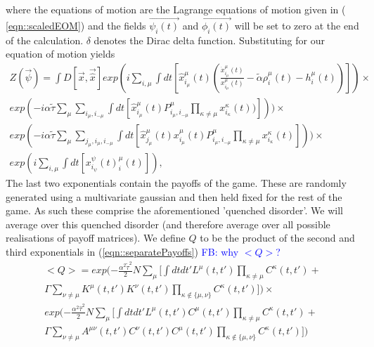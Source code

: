 \documentclass[sigconf,anonymous]{aamas}
\newcommand{\xmu}[2]{x_{#1_#2}^{#2}(t)}
\newcommand{\payoff}[2]{P^{#2}_{#1_#2, #1_{-#2}}}
\newcommand{\dxmu}[1]{\dot{x}_{#1_\mu}^{\mu} (t)}
\newcommand{\hxmu}[1]{\hat{x}_{#1_\mu}^{\mu} (t)}
\newcommand{\talpha}{\tilde{\alpha}}
\newcommand{\ttau}{\tilde{\tau}}
\newcommand{\htau}{\hat{\tau}}
\newcommand\fb[1]{\textcolor{blue}{FB: #1}}
\begin{document}
where the equations of motion are the Lagrange equations of motion
given in ( \ref{eqn::scaledEOM}) and the fields $\Vec{\psi_i(t)}$ and
$\Vec{\phi_i(t)}$ will be set to zero at the end of the
calculation. $\delta$ denotes the Dirac delta function. Substituting
for our equation of motion yields
%
{\small
\begin{equation}
\label{eqn::separatePayoffs}
	\begin{split}
	Z(\Vec{\psi}) = \int D[\Vec{x}, \Vec{\hat{x}}] exp( i \sum_{i, \mu} \int dt [ \hxmu{i} (\frac{\dxmu{i}}{\xmu{i}{\mu}} - \talpha \rho_i^\mu (t) - h_i^\mu (t))]) \times \\ exp(-i \alpha \ttau \sum_{\mu} \sum_{i_\mu, i_{-\mu}} \int dt [\hxmu{i} \payoff{i}{\mu} \prod_{\kappa \neq \mu} \xmu{i}{\kappa} )])) 
    \times \\ exp(-i \alpha \ttau \sum_{\mu} \sum_{j_\mu, i_\mu, i_{-\mu}} \int dt [\hxmu{j}  \xmu{i}{\mu} \payoff{i}{\mu} \prod_{\kappa \neq \mu} \xmu{i}{\kappa}])) 
	\times \\ exp(i \sum_{i, \mu}
	\int dt[\xmu{i} \psi^\mu_i(t)]),
\end{split}
\end{equation}
}
The last two exponentials contain the payoffs of the game. These are randomly generated using a multivariate gaussian and then held fixed for the rest of the game. As such these comprise the aforementioned 'quenched disorder'. We will average over this quenched disorder (and therefore average over all possible realisations of payoff matrices). We define $Q$ to be the product of the second and third exponentials in (\ref{eqn::separatePayoffs}) 
%
\fb{why $<Q>$?}
\begin{equation}
\begin{split}
        <Q> = exp(- \frac{\alpha^2 \ttau ^2}{2} N \sum_{\mu} \Big [ \int dt dt' L^\mu(t, t') \prod_{\kappa \neq \mu} C^\kappa (t, t') + \\ \Gamma \sum_{\nu \neq \mu} K^\mu (t, t') K^\nu (t, t') \prod_{\kappa \not\in \{\mu, \nu\}} C^\kappa (t, t') \Big ] ) \times \\
        exp(- \frac{\alpha^2 \htau ^2}{2} N \sum_{\mu} \Big [ \int dt dt' L^\mu(t, t') C^\mu (t, t') \prod_{\kappa \neq \mu} C^\kappa (t, t') + \\ \Gamma \sum_{\nu \neq \mu} A^{\mu \nu} (t, t') C^\nu (t, t') C^\mu (t, t') \prod_{\kappa \not\in \{\mu, \nu\}} C^\kappa (t, t') \Big ] )
\end{split}
\end{equation}
\end{document}
